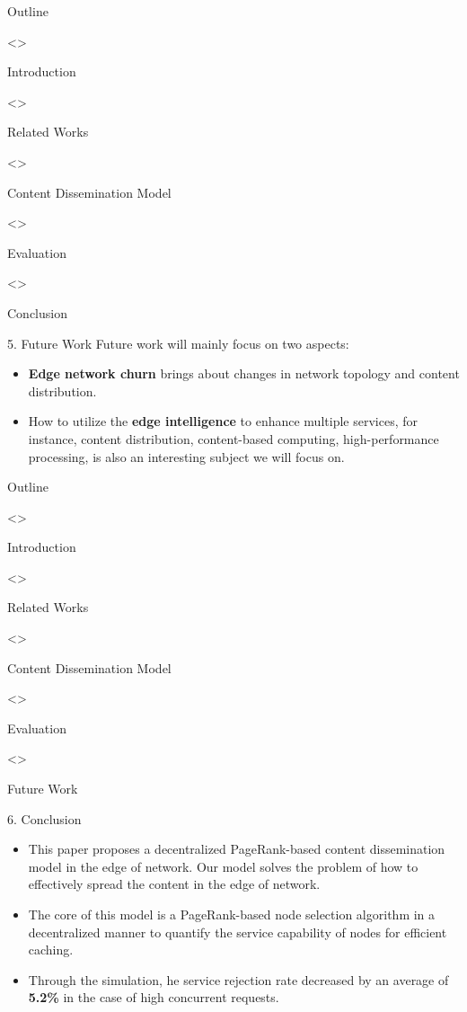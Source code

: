 \documentclass{beamer}		%
\begin{document}
\begin{frame}{Outline}
\begin{enumerate}[1. ]
\uncover<>{\item Introduction}
\uncover<>{\item Related Works}
\uncover<>{\item Content Dissemination Model}
\uncover<>{\item Evaluation}
\uncover<>{\item Conclusion}
\end{enumerate}
\end{frame}

\begin{frame}{5. Future Work}
Future work will mainly focus on two aspects:
\begin{itemize}
    \item \textbf{Edge network churn} brings about changes in network topology and content distribution.
    \item How to utilize the \textbf{edge intelligence} to enhance multiple services, for instance, content distribution, content-based computing, high-performance processing, is also an interesting subject we will focus on.
\end{itemize}
\end{frame}

\begin{frame}{Outline}
\begin{enumerate}[1. ]
\uncover<>{\item Introduction}
\uncover<>{\item Related Works}
\uncover<>{\item Content Dissemination Model}
\uncover<>{\item Evaluation}
\uncover<>{\item Future Work}
\end{enumerate}
\end{frame}

\begin{frame}{6. Conclusion}
\begin{itemize}
    \item This paper proposes a decentralized PageRank-based content dissemination model in the edge of network. Our model solves the problem of how to effectively spread the content in the edge of network.
    \item The core of this model is a PageRank-based node selection algorithm in a decentralized manner to quantify the service capability of nodes for efficient caching.
    \item  Through the simulation, he service rejection rate decreased by an average of \textbf{5.2\%} in the case of high concurrent requests.
\end{itemize}
\end{frame}
\end{document}

